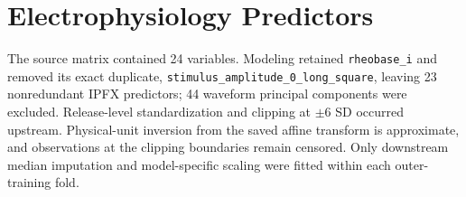 \documentclass[11pt]{article}
\begin{document}
\section{Electrophysiology Predictors}
The source matrix contained 24 variables. Modeling retained \texttt{rheobase\_\allowbreak{}i} and removed its exact duplicate, \texttt{stimulus\_\allowbreak{}amplitude\_\allowbreak{}0\_\allowbreak{}long\_\allowbreak{}square}, leaving 23 nonredundant IPFX predictors; 44 waveform principal components were excluded. Release-level standardization and clipping at $\pm6$ SD occurred upstream. Physical-unit inversion from the saved affine transform is approximate, and observations at the clipping boundaries remain censored. Only downstream median imputation and model-specific scaling were fitted within each outer-training fold.
\end{document}
